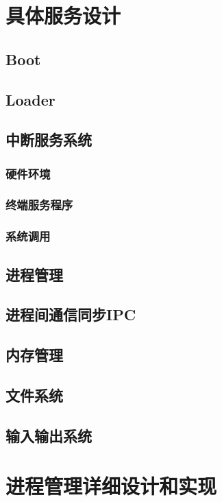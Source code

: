 \documentclass[UTF8,nofonts]{ctexrep}
\begin{document}
\chapter{具体服务设计}
\section{Boot}
\section{Loader}
\section{中断服务系统}
\subsection{硬件环境}

\subsection{终端服务程序}
\subsection{系统调用}
\section{进程管理}
\section{进程间通信同步IPC}
\section{内存管理}
\section{文件系统}
\section{输入输出系统}
\chapter{进程管理详细设计和实现}
\end{document}

